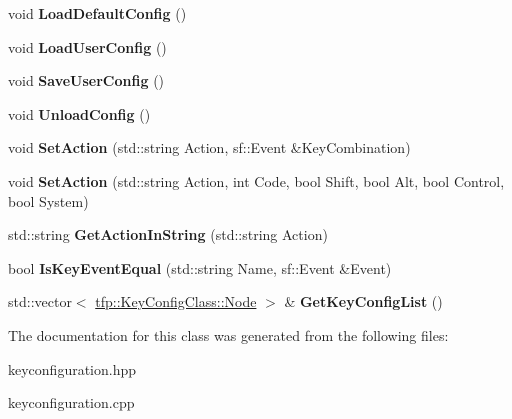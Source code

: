 \begin{DoxyCompactItemize}
\item 
\mbox{\label{classtfp_1_1_key_config_class_a48ca31d818fc5c2a1baf17d82d9d3e98}} 
void {\bfseries Load\+Default\+Config} ()
\item 
\mbox{\label{classtfp_1_1_key_config_class_a263ad96455b251eed9861b26540ae67f}} 
void {\bfseries Load\+User\+Config} ()
\item 
\mbox{\label{classtfp_1_1_key_config_class_a952bf0ff3d7a8510981b6221ab5101cb}} 
void {\bfseries Save\+User\+Config} ()
\item 
\mbox{\label{classtfp_1_1_key_config_class_aab49780b61a5bebe9e7b9d473f3e3a4f}} 
void {\bfseries Unload\+Config} ()
\item 
\mbox{\label{classtfp_1_1_key_config_class_a04b2d5bc760809597821afd82c33fb41}} 
void {\bfseries Set\+Action} (std\+::string Action, sf\+::\+Event \&Key\+Combination)
\item 
\mbox{\label{classtfp_1_1_key_config_class_a380c651d2196ecb8e658f8dac47d1c33}} 
void {\bfseries Set\+Action} (std\+::string Action, int Code, bool Shift, bool Alt, bool Control, bool System)
\item 
\mbox{\label{classtfp_1_1_key_config_class_a99d24987114ee3b1d274ef8fc9c6f557}} 
std\+::string {\bfseries Get\+Action\+In\+String} (std\+::string Action)
\item 
\mbox{\label{classtfp_1_1_key_config_class_afe23ce94b131a39b230bcab64e4fcad0}} 
bool {\bfseries Is\+Key\+Event\+Equal} (std\+::string Name, sf\+::\+Event \&Event)
\item 
\mbox{\label{classtfp_1_1_key_config_class_ac7f15f67a2767c11f23076d7b611b193}} 
std\+::vector$<$ \mbox{\hyperlink{structtfp_1_1_key_config_class_1_1_node}{tfp\+::\+Key\+Config\+Class\+::\+Node}} $>$ \& {\bfseries Get\+Key\+Config\+List} ()
\end{DoxyCompactItemize}


The documentation for this class was generated from the following files\+:\begin{DoxyCompactItemize}
\item 
keyconfiguration.\+hpp\item 
keyconfiguration.\+cpp\end{DoxyCompactItemize}
